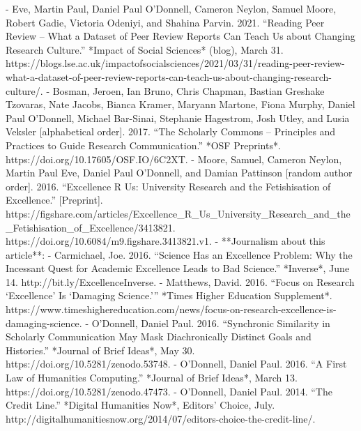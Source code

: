 - Eve, Martin Paul, Daniel Paul O’Donnell, Cameron Neylon, Samuel Moore, Robert Gadie, Victoria Odeniyi, and Shahina Parvin. 2021. “Reading Peer Review – What a Dataset of Peer Review Reports Can Teach Us about Changing Research Culture.” *Impact of Social Sciences* (blog), March 31. https:/\allowbreak{}/\allowbreak{}blogs.lse.ac.uk/\allowbreak{}impactofsocialsciences/\allowbreak{}2021/\allowbreak{}03/\allowbreak{}31/\allowbreak{}reading-peer-review-what-a-dataset-of-peer-review-reports-can-teach-us-about-changing-research-culture/\allowbreak{}.
- Bosman, Jeroen, Ian Bruno, Chris Chapman, Bastian Greshake Tzovaras, Nate Jacobs, Bianca Kramer, Maryann Martone, Fiona Murphy, Daniel Paul O’Donnell, Michael Bar-Sinai, Stephanie Hagestrom, Josh Utley, and Lusia Veksler [alphabetical order]. 2017. “The Scholarly Commons – Principles and Practices to Guide Research Communication.” *OSF Preprints*. https:/\allowbreak{}/\allowbreak{}doi.org/\allowbreak{}10.17605/\allowbreak{}OSF.IO/\allowbreak{}6C2XT.
- Moore, Samuel\*, Cameron Neylon, Martin Paul Eve, Daniel Paul O’Donnell, and Damian Pattinson [random author order]. 2016. “Excellence R Us: University Research and the Fetishisation of Excellence.” [Preprint]. https:/\allowbreak{}/\allowbreak{}figshare.com/\allowbreak{}articles/\allowbreak{}Excellence_R_Us_University_Research_and_the_Fetishisation_of_Excellence/\allowbreak{}3413821. https:/\allowbreak{}/\allowbreak{}doi.org/\allowbreak{}10.6084/\allowbreak{}m9.figshare.3413821.v1.
\sectionbreak{}
  - **Journalism about this article**:
    - Carmichael, Joe. 2016. “Science Has an Excellence Problem: Why the Incessant Quest for Academic Excellence Leads to Bad Science.” *Inverse*, June 14. http:/\allowbreak{}/\allowbreak{}bit.ly/\allowbreak{}ExcellenceInverse.
    - Matthews, David. 2016. “Focus on Research ‘Excellence’ Is ‘Damaging Science.’” *Times Higher Education Supplement*. 
    https:/\allowbreak{}/\allowbreak{}www.\allowbreak{}timeshighereducation.\allowbreak{}com/\allowbreak{}news/\allowbreak{}focus-on-research-excellence-is-damaging-science.
- O’Donnell, Daniel Paul. 2016. “Synchronic Similarity in Scholarly Communication May Mask Diachronically Distinct Goals and Histories.” *Journal of Brief Ideas*, May 30. https:/\allowbreak{}/\allowbreak{}doi.org/\allowbreak{}10.5281/\allowbreak{}zenodo.53748.
- O’Donnell, Daniel Paul. 2016. “A First Law of Humanities Computing.” *Journal of Brief Ideas*, March 13. https:/\allowbreak{}/\allowbreak{}doi.org/\allowbreak{}10.5281/\allowbreak{}zenodo.47473.
- O’Donnell, Daniel Paul. 2014. “The Credit Line.” *Digital Humanities Now*, Editors’ Choice, July. http:/\allowbreak{}/\allowbreak{}digitalhumanitiesnow.org/\allowbreak{}2014/\allowbreak{}07/\allowbreak{}editors-choice-the-credit-line/\allowbreak{}.
